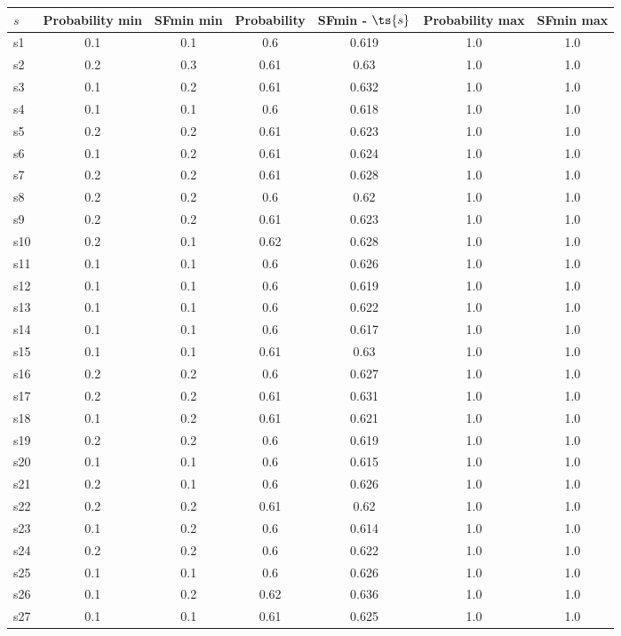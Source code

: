 \documentclass{article}
\begin{document}
\noindent\begin{tabular}{|l|c|c|c|c|c|c|}
\hline
$s$& Probability min & SFmin min & Probability & SFmin - $\ts{s}$ & Probability max & SFmin max\\
\hline
s1 &0.1 & 0.1 & 0.6 & 0.619 & 1.0 & 1.0\\
\hline
s2 &0.2 & 0.3 & 0.61 & 0.63 & 1.0 & 1.0\\
\hline
s3 &0.1 & 0.2 & 0.61 & 0.632 & 1.0 & 1.0\\
\hline
s4 &0.1 & 0.1 & 0.6 & 0.618 & 1.0 & 1.0\\
\hline
s5 &0.2 & 0.2 & 0.61 & 0.623 & 1.0 & 1.0\\
\hline
s6 &0.1 & 0.2 & 0.61 & 0.624 & 1.0 & 1.0\\
\hline
s7 &0.2 & 0.2 & 0.61 & 0.628 & 1.0 & 1.0\\
\hline
s8 &0.2 & 0.2 & 0.6 & 0.62 & 1.0 & 1.0\\
\hline
s9 &0.2 & 0.2 & 0.61 & 0.623 & 1.0 & 1.0\\
\hline
s10 &0.2 & 0.1 & 0.62 & 0.628 & 1.0 & 1.0\\
\hline
s11 &0.1 & 0.1 & 0.6 & 0.626 & 1.0 & 1.0\\
\hline
s12 &0.1 & 0.1 & 0.6 & 0.619 & 1.0 & 1.0\\
\hline
s13 &0.1 & 0.1 & 0.6 & 0.622 & 1.0 & 1.0\\
\hline
s14 &0.1 & 0.1 & 0.6 & 0.617 & 1.0 & 1.0\\
\hline
s15 &0.1 & 0.1 & 0.61 & 0.63 & 1.0 & 1.0\\
\hline
s16 &0.2 & 0.2 & 0.6 & 0.627 & 1.0 & 1.0\\
\hline
s17 &0.2 & 0.2 & 0.61 & 0.631 & 1.0 & 1.0\\
\hline
s18 &0.1 & 0.2 & 0.61 & 0.621 & 1.0 & 1.0\\
\hline
s19 &0.2 & 0.2 & 0.6 & 0.619 & 1.0 & 1.0\\
\hline
s20 &0.1 & 0.1 & 0.6 & 0.615 & 1.0 & 1.0\\
\hline
s21 &0.2 & 0.1 & 0.6 & 0.626 & 1.0 & 1.0\\
\hline
s22 &0.2 & 0.2 & 0.61 & 0.62 & 1.0 & 1.0\\
\hline
s23 &0.1 & 0.2 & 0.6 & 0.614 & 1.0 & 1.0\\
\hline
s24 &0.2 & 0.2 & 0.6 & 0.622 & 1.0 & 1.0\\
\hline
s25 &0.1 & 0.1 & 0.6 & 0.626 & 1.0 & 1.0\\
\hline
s26 &0.1 & 0.2 & 0.62 & 0.636 & 1.0 & 1.0\\
\hline
s27 &0.1 & 0.1 & 0.61 & 0.625 & 1.0 & 1.0\\

\end{tabular}
\end{document}

